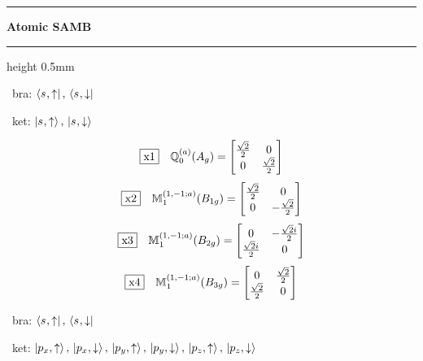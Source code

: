\documentclass[fleqn,10pt,landscape]{jsarticle}
\begin{document}
\vspace{5mm}
\noindent \rule[0.5mm]{5mm}{0.5mm}\hspace{3mm}\textbf{Atomic SAMB}\hspace{3mm}\leaders\hrule height 0.5mm\hfill\kern0pt
\vspace{3mm}

\vspace{5mm}

\noindent\textbullet\, bra: $\bra{s_{},\uparrow},\, \bra{s_{},\downarrow}$

\noindent\textbullet\, ket: $\ket{s_{},\uparrow},\, \ket{s_{},\downarrow}$

\begin{dmath*}
\fbox{x1}\quad \mathbb{Q}_{0}^{(a)}(A_{g})=\begin{bmatrix} \frac{\sqrt{2}}{2} & 0 \\ 0 & \frac{\sqrt{2}}{2} \end{bmatrix}
\end{dmath*}
\begin{dmath*}
\fbox{x2}\quad \mathbb{M}_{1}^{(1,-1;a)}(B_{1g})=\begin{bmatrix} \frac{\sqrt{2}}{2} & 0 \\ 0 & - \frac{\sqrt{2}}{2} \end{bmatrix}
\end{dmath*}
\begin{dmath*}
\fbox{x3}\quad \mathbb{M}_{1}^{(1,-1;a)}(B_{2g})=\begin{bmatrix} 0 & - \frac{\sqrt{2} i}{2} \\ \frac{\sqrt{2} i}{2} & 0 \end{bmatrix}
\end{dmath*}
\begin{dmath*}
\fbox{x4}\quad \mathbb{M}_{1}^{(1,-1;a)}(B_{3g})=\begin{bmatrix} 0 & \frac{\sqrt{2}}{2} \\ \frac{\sqrt{2}}{2} & 0 \end{bmatrix}
\end{dmath*}
\vspace{5mm}

\noindent\textbullet\, bra: $\bra{s_{},\uparrow},\, \bra{s_{},\downarrow}$

\noindent\textbullet\, ket: $\ket{p_{x},\uparrow},\, \ket{p_{x},\downarrow},\, \ket{p_{y},\uparrow},\, \ket{p_{y},\downarrow},\, \ket{p_{z},\uparrow},\, \ket{p_{z},\downarrow}$
\end{document}

